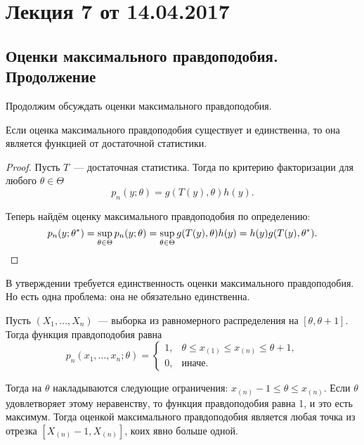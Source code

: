 \section{Лекция 7 от 14.04.2017}
\subsection{Оценки максимального правдоподобия. Продолжение}
Продолжим обсуждать оценки максимального правдоподобия.
\begin{point}
	Если оценка максимального правдоподобия существует и единственна, то она 
	является функцией от достаточной статистики.
\end{point}
\begin{proof}
	Пусть \(T\)~--- достаточная статистика. Тогда по критерию факторизации для 
	любого \(\theta \in \Theta\)
	\[
		p_{n}(y; \theta) = g(T(y), \theta)h(y).
	\]
	
	Теперь найдём оценку максимального правдоподобия по определению:
	\[
		p_{n}(y; \theta^{*}) = \sup_{\theta \in \Theta} p_{n}(y; \theta) = 
		\sup_{\theta \in \Theta} g(T(y), \theta)h(y) = h(y)g(T(y), \theta^{*}). 
		\qedhere
	\]
\end{proof}

В утверждении требуется единственность оценки максимального правдоподобия. Но 
есть одна проблема: она не обязательно единственна. 
\begin{example}
	Пусть \((X_{1}, \dots, X_{n})\)~--- выборка из равномерного распределения 
	на \([\theta, \theta + 1]\). Тогда функция правдоподобия равна
	\[
		p_{n}(x_{1}, \dots, x_{n}; \theta) =
		\begin{cases}
			1,& \theta \leq x_{(1)} \leq x_{(n)} \leq \theta + 1, \\
			0,& \text{иначе}.
		\end{cases}
	\]
	
	Тогда на \(\theta\) накладываются следующие ограничения: \(x_{(n)} - 1 \leq 
	\theta \leq x_{(n)}\). Если \(\theta\) удовлетворяет этому неравенству, то 
	функция правдоподобия равна 1, и это есть максимум. Тогда оценкой 
	максимального правдоподобия является любая точка из отрезка \([X_{(n)} - 1, 
	X_{(n)}]\), коих явно больше одной.
\end{example}

